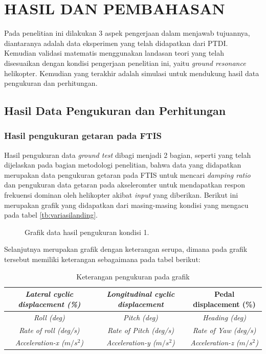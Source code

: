 \chapter{HASIL DAN PEMBAHASAN}
\label{chap:hasil dan pembahasan}


Pada penelitian ini dilakukan 3 aspek pengerjaan dalam menjawab tujuannya, diantaranya adalah data eksperimen yang telah didapatkan dari PTDI. Kemudian validasi matematis menggunakan landasan teori yang telah disesuaikan dengan kondisi pengerjaan penelitian ini, yaitu \textit{ground resonance} helikopter. Kemudian yang terakhir adalah simulasi untuk mendukung hasil data pengukuran dan perhitungan. 

\section{Hasil Data Pengukuran dan Perhitungan}
\label{sec:hasilpengukuran}

\subsection{Hasil pengukuran getaran pada FTIS}

Hasil pengukuran data \textit{ground test} dibagi menjadi 2 bagian, seperti yang telah dijelaskan pada bagian metodologi penelitian, bahwa data yang didapatkan merupakan data pengukuran getaran pada FTIS untuk mencari \textit{damping ratio} dan pengukuran data getaran pada akseleromter untuk mendapatkan respon frekuensi dominan oleh helikopter akibat \textit{input} yang diberikan. Berikut ini merupakan grafik yang didapatkan dari masing-masing kondisi yang mengacu pada tabel \ref{tb:variasilanding}.

\begin{figure}[H]
	\centering
	\caption{Grafik data hasil pengukuran kondisi 1.}
	\label{fig:condition_1}
\end{figure}

Selanjutnya merupakan grafik dengan keterangan serupa, dimana pada grafik tersebut memiliki keterangan sebagaimana pada tabel berikut:

\begin{table}[]
	\caption{Keterangan pengukuran pada grafik}
	\begin{tabular}{|c|c|c|}
		\hline
		\textit{Lateral cyclic displacement (\%)} & \textit{Longitudinal cyclic displacement} & Pedal displacement (\%)           \\ \hline
		\textit{Roll (deg)}                       & \textit{Pitch (deg)}                      & \textit{Heading (deg)}            \\ \hline
		\textit{Rate of roll (deg/s)}             & \textit{Rate of Pitch (deg/s)}            & \textit{Rate of Yaw (deg/s)}      \\ \hline
		\textit{Acceleration-x ($m/s^2$)}         & \textit{Acceleration-y ($m/s^2$)}         & \textit{Acceleration-z ($m/s^2$)} \\ \hline
	\end{tabular}
\end{table}

